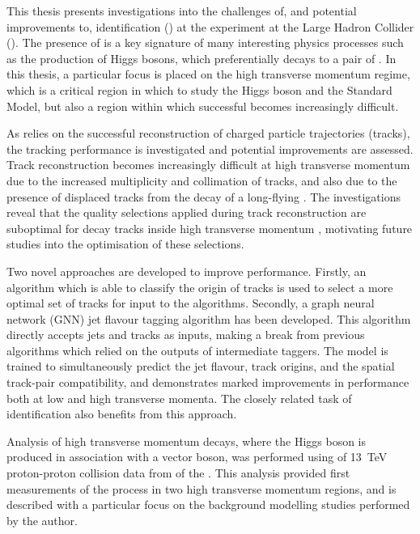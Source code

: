 
This thesis presents investigations into the challenges of, and potential improvements to, \bjet identification (\btagging) at the \ATLAS experiment at the Large Hadron Collider (\LHC).
The presence of \bjets is a key signature of many interesting physics processes such as the production of Higgs bosons, which preferentially decays to a pair of \bquarks.
In this thesis, a particular focus is placed on the high transverse momentum regime, which is a critical region in which to study the Higgs boson and the Standard Model, but also a region within which successful \btagging becomes increasingly difficult.

As \btagging relies on the successful reconstruction of charged particle trajectories (tracks), the tracking performance is investigated and potential improvements are assessed.
Track reconstruction becomes increasingly difficult at high transverse momentum due to the increased multiplicity and collimation of tracks, and also due to the presence of displaced tracks from the decay of a long-flying \bhadron.
The investigations reveal that the quality selections applied during track reconstruction are suboptimal for \bhadron decay tracks inside high transverse momentum \bjets, motivating future studies into the optimisation of these selections.

Two novel approaches are developed to improve \btagging performance.
Firstly, an algorithm which is able to classify the origin of tracks is used to select a more optimal set of tracks for input to the \btagging algorithms.
Secondly, a graph neural network (GNN) jet flavour tagging algorithm has been developed.
This algorithm directly accepts jets and tracks as inputs, making a break from previous algorithms which relied on the outputs of intermediate taggers.
The model is trained to simultaneously predict the jet flavour, track origins, and the spatial track-pair compatibility, and demonstrates marked improvements in \btagging performance both at low and high transverse momenta.
The closely related task of \cjet identification also benefits from this approach.

Analysis of high transverse momentum \Hbb decays, where the Higgs boson is produced in association with a vector boson, was performed using \intlumi of \SI{13}{\TeV} proton-proton collision data from \runtwo of the \LHC.
This analysis provided first measurements of the \VHbb process in two high transverse momentum regions, and is described with a particular focus on the background modelling studies performed by the author.
